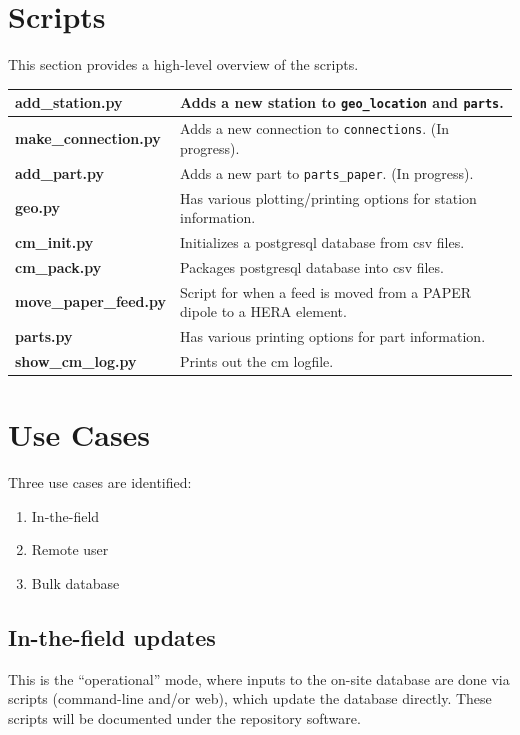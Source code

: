 \documentclass{article}
\begin{document}
\section{Scripts}
This section provides a high-level overview of the scripts.  
\vspace{0.5cm}

\begin{tabular}{l p{12cm}}
{\bf add\_station.py} & Adds a new station to {\tt geo\_location} and {\tt parts}.\\ \hline
{\bf make\_connection.py} & Adds a new connection to {\tt connections}. (In progress).\\ \hline
{\bf add\_part.py} & Adds a new part to {\tt parts\_paper}. (In progress).\\ \hline
{\bf geo.py} & Has various plotting/printing options for station information. \\ \hline
{\bf cm\_init.py} & Initializes a postgresql database from csv files. \\ \hline
{\bf cm\_pack.py} & Packages postgresql database into csv files. \\ \hline
{\bf move\_paper\_feed.py} & Script for when a feed is moved from a PAPER dipole to a HERA element. \\ \hline
{\bf parts.py} & Has various printing options for part information. \\ \hline
{\bf show\_cm\_log.py} & Prints out the cm logfile. \\
\end{tabular}

\section{Use Cases}
Three use cases are identified:
\begin{enumerate}\setlength\itemsep{-.3em}
	\item In-the-field
	\item Remote user
	\item Bulk database
\end{enumerate}

\subsection{In-the-field updates}
This is the ``operational'' mode, where inputs to the on-site database are done via scripts (command-line and/or web), which update the database directly.  These scripts will be documented under the repository software.
\end{document}
